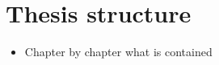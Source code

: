 \chapter{Thesis structure}

\begin{itemize}
\item Chapter by chapter what is contained
\end {itemize}
